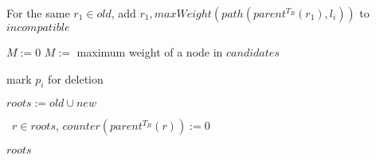 \documentclass{article}
\newcommand{\leafset}{\Lambda}
\begin{document}
\begin{algorithm}
\begin{algorithmic}[1]
                    \State For the same $r_1 \in old$, add $r_1, maxWeight(path(parent^{T_B}(r_1), l_i))$ to $incompatible$
                \EndIf

                    {$M := 0$}
                    $M :=$ maximum weight of a node in $candidates$

                \IIf{$w(\leafset(T_A[p_i])) \leq M$}
                    mark $p_i$ for deletion

                \State $roots := old \cup new$
            \EndFor

            \State \algorithmicforall\ $r \in roots$, $counter(parent^{T_B}(r)) := 0$

            \State \Return $roots$
        \end{algorithmic}
    \end{algorithm}
\end{document}
